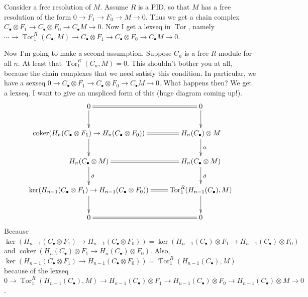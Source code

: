 \documentclass{amsart}
\theoremstyle{theorem}
\theoremstyle{definition}
\DeclareMathOperator{\coker}{coker}
\DeclareMathOperator{\Tor}{Tor}
\begin{document}
Consider a free resolution of $M$. Assume $R$ is a PID, so that $M$ has a free resolution of the form $0\to F_1\to F_0\to M\to 0$. Thus we get a chain complex $C_\bullet\otimes F_1\to C_\bullet\otimes F_0\to C_\bullet M\to 0$. Now I get a lexseq in $\Tor$, namely $\cdots\to\Tor^R_1(C_\bullet,M)\to C_\bullet\otimes F_1\to C_\bullet\otimes F_0\to C_\bullet M\to 0$.

Now I'm going to make a second assumption. Suppose $C_n$ is a free $R$-module for all $n$. At least that $\Tor^R_1(C_n,M)=0$. This shouldn't bother you at all, because the chain complexes that we need satisfy this condition. In particular, we have a sexseq $0\to C_\bullet\otimes F_1\to C_\bullet\otimes F_0\to C_\bullet M\to 0$. What happens then? We get a lexseq. I want to give an unspliced form of this (huge diagram coming up!).
\begin{equation*}
\xymatrix{0\ar[d]\ar@{=}[r] & 0\ar[d]\\
\coker( H_n(C_\bullet\otimes F_1)\to H_n(C_\bullet\otimes F_0))\ar[d]\ar@{=}[r] & H_n(C_\bullet)\otimes M\ar[d]^\alpha\\
 H_n(C_\bullet\otimes M)\ar[d]^\partial\ar@{=}[r] & H_n(C_\bullet\otimes M)\ar[d]^\partial\\
\ker( H_{n-1}(C_\bullet\otimes F_1)\to H_{n-1}(C_\bullet\otimes F_0))\ar@{=}[r]\ar[d] & \Tor^R_{1}( H_{n-1}(C_\bullet),M)\ar[d]\\
0\ar@{=}[r] & 0}
\end{equation*}
Because $\ker( H_{n-1}(C_\bullet\otimes F_1)\to H_{n-1}(C_\bullet\otimes F_0))=\ker( H_{n-1}(C_\bullet)\otimes F_1\to H_{n-1}(C_\bullet)\otimes F_0)$ and $\coker( H_n(C_\bullet)\otimes F_1\to H_n(C_\bullet)\otimes F_0)$. Also, $\ker( H_{n-1}(C_\bullet\otimes F_1)\to H_{n-1}(C_\bullet\otimes F_0))=\Tor^R_{1}( H_{n-1}(C_\bullet),M)$ because of the lexseq $0\to \Tor^R_1( H_{n-1}(C_\bullet),M)\to H_{n-1}(C_\bullet)\otimes F_1\to H_{n-1}(C_\bullet)\otimes F_0\to H_{n-1}(C_\bullet)\otimes M\to 0$.
\end{document}
